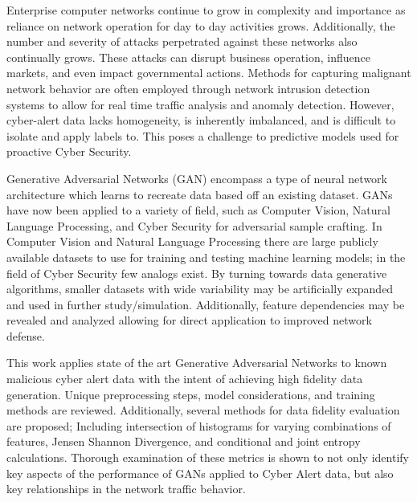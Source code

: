 \documentclass[12pt,american]{report}
\begin{document}
\begin{abstractpage}
	
Enterprise computer networks continue to grow in complexity and importance as reliance on network operation for day to day activities grows. Additionally, the number and severity of attacks perpetrated against these networks also continually grows. These attacks can disrupt business operation, influence markets, and even impact governmental actions. Methods for capturing malignant network behavior are often employed through network intrusion detection systems to allow for real time traffic analysis and anomaly detection. However, cyber-alert data lacks homogeneity, is inherently imbalanced, and is difficult to isolate and apply labels to. This poses a challenge to predictive models used for proactive Cyber Security. 

Generative Adversarial Networks (GAN) encompass a type of neural network architecture which learns to recreate data based off an existing dataset. GANs have now been applied to a variety of field, such as Computer Vision, Natural Language Processing, and Cyber Security for adversarial sample crafting. In Computer Vision and Natural Language Processing there are large publicly available datasets to use for training and testing machine learning models; in the field of Cyber Security few analogs exist. By turning towards data generative algorithms, smaller datasets with wide variability may be artificially expanded and used in further study/simulation. Additionally, feature dependencies may be revealed and analyzed allowing for direct application to improved network defense.

This work applies state of the art Generative Adversarial Networks to known malicious cyber alert data with the intent of achieving high fidelity data generation. Unique preprocessing steps, model considerations, and training methods are reviewed. Additionally, several methods for data fidelity evaluation are proposed; Including intersection of histograms for varying combinations of features, Jensen Shannon Divergence, and conditional and joint entropy calculations. Thorough examination of these metrics is shown to not only identify key aspects of the performance of GANs applied to Cyber Alert data, but also key relationships in the network traffic behavior. 

\end{abstractpage}
\end{document}
